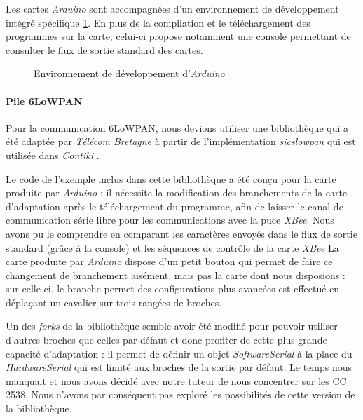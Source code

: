 Les cartes \emph{Arduino} sont accompagnées d’un environnement de développement intégré spécifique \cref{arduino-ide}.
En plus de la compilation et le téléchargement des programmes sur la carte, celui-ci propose notamment une console permettant de consulter le flux de sortie standard des cartes.

\begin{figure}[H]
\centering
{}
\caption{Environnement de développement d’\emph{Arduino}}
\label{arduino-ide}
\end{figure}

\paragraph{Pile 6LoWPAN}

Pour la communication 6LoWPAN, nous devions utiliser une bibliothèque qui a été adaptée par \emph{Télécom Bretagne} à partir de l’implémentation \emph{sicslowpan} qui est utilisée dans \emph{Contiki} .

Le code de l’exemple inclus dans cette bibliothèque a été conçu pour la carte produite par \emph{Arduino} : il nécessite la modification des branchements de la carte d’adaptation après le téléchargement du programme, afin de laisser le canal de communication série libre pour les communications avec la puce \emph{XBee}.
Nous avons pu le comprendre en comparant les caractères envoyés dans le flux de sortie standard (grâce à la console) et les séquences de contrôle de la carte \emph{XBee}
La carte produite par \emph{Arduino} dispose d’un petit bouton qui permet de faire ce changement de branchement aisément, mais pas la carte dont nous disposions : sur celle-ci, le branche permet des configurations plus avancées est effectué en déplaçant un cavalier sur trois rangées de broches.

Un des \textit{forks} de la bibliothèque  semble avoir été modifié pour pouvoir utiliser d’autres broches que celles par défaut et donc profiter de cette plus grande capacité d’adaptation : il permet de définir un objet \textit{SoftwareSerial} à la place du \textit{HardwareSerial} qui est limité aux broches de la sortie par défaut.
Le temps nous manquait et nous avons décidé avec notre tuteur de nous concentrer sur les CC 2538.
Nous n’avons par conséquent pas exploré les possibilités de cette version de la bibliothèque.


